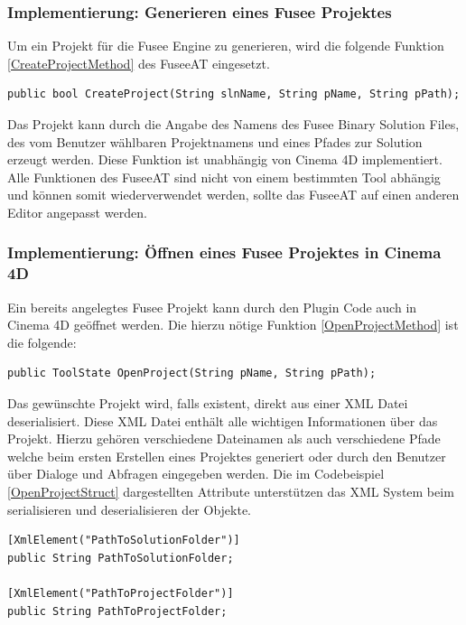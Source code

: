 \documentclass[pagesize, paper=a4, fontsize=12pt, titlepage=true, headings=small, headnosepline, abstractoff, liststotoc, nochapterprefix, plainheadsepline, twoside]{scrreprt}
\begin{document}
\subsubsection{Implementierung: Generieren eines Fusee Projektes}
Um ein Projekt für die Fusee Engine zu generieren, wird die folgende Funktion \ref{CreateProjectMethod} des FuseeAT eingesetzt. 
\begin{lstlisting}[label=CreateProjectMethod, caption=Funktion zum Generieren eines neuen Projekts in der Binary Version der Fusee Engine.]
	public bool CreateProject(String slnName, String pName, String pPath);
\end{lstlisting}
Das Projekt kann durch die Angabe des Namens des Fusee Binary Solution Files, des vom Benutzer wählbaren Projektnamens und eines Pfades zur Solution erzeugt werden. Diese Funktion ist unabhängig von Cinema 4D implementiert. Alle Funktionen des FuseeAT sind nicht von einem bestimmten Tool abhängig und können somit wiederverwendet werden, sollte das FuseeAT auf einen anderen Editor angepasst werden.

\subsubsection{Implementierung: Öffnen eines Fusee Projektes in Cinema 4D}
Ein bereits angelegtes Fusee Projekt kann durch den Plugin Code auch in Cinema 4D geöffnet werden. Die hierzu nötige Funktion \ref{OpenProjectMethod} ist die folgende:
\begin{lstlisting}[label=OpenProjectMethod, caption=Funktion zum öffnen eines neuen Projekts in der Binary Version der Fusee Engine.]
	public ToolState OpenProject(String pName, String pPath);
\end{lstlisting}
Das gewünschte Projekt wird, falls existent, direkt aus einer XML Datei deserialisiert. Diese XML Datei enthält alle wichtigen Informationen über das Projekt. Hierzu gehören verschiedene Dateinamen als auch verschiedene Pfade welche beim ersten Erstellen eines Projektes generiert oder durch den Benutzer über Dialoge und Abfragen eingegeben werden. Die im Codebeispiel \ref{OpenProjectStruct} dargestellten Attribute unterstützen das XML System beim serialisieren und deserialisieren der Objekte.

\begin{lstlisting}[label=OpenProjectStruct, caption=Teil des Structs zum Serialisieren des Fusee Projektes aus Cinem a 4D. Die Serialisierung speichert das Projekt auf der Festplatte als lesbare XML Datei.]
[XmlElement("PathToSolutionFolder")]
public String PathToSolutionFolder;

[XmlElement("PathToProjectFolder")]
public String PathToProjectFolder;
\end{lstlisting}
\end{document}
